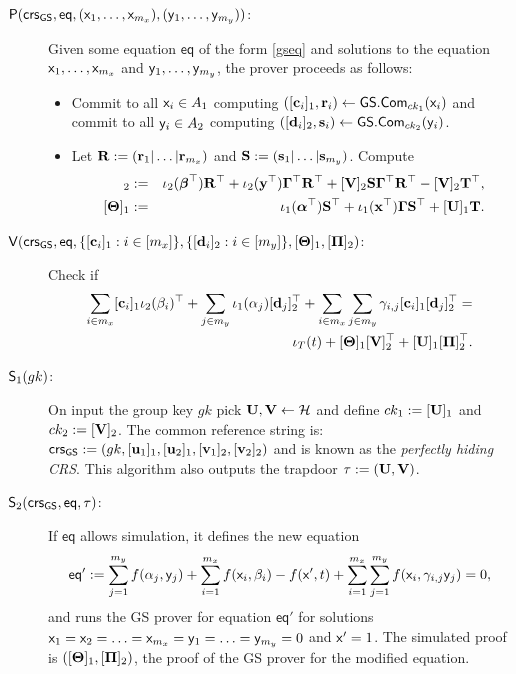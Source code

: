 \begin{description}
\item[$\mathsf{P}(\mathsf{crs}_{\mathsf{GS}},\mathsf{eq},(\mathsf{x}_1,\ldots,\mathsf{x}_{m_x}),(\mathsf{y}_1,\ldots,\mathsf{y}_{m_y}))$:] Given some equation $\mathsf{eq}$ of the form \ref{gseq} and solutions to the equation
$\mathsf{x}_1,\ldots,\mathsf{x}_{m_x}$ and $\mathsf{y}_1,\ldots,\mathsf{y}_{m_y}$, the prover proceeds as follows:
\begin{itemize}
\item Commit to all $\mathsf{x}_i \in A_1$ computing $([\mathbf{c}_i]_1,\mathbf{r}_i)\gets{\mathsf{GS}}.\mathsf{Com}_{ck_1}(\mathsf{x}_i)$ and commit to all $\mathsf{y}_i \in A_2$ computing $([\mathbf{d}_i]_2,\mathbf{s}_i)\gets{\mathsf{GS}}.\mathsf{Com}_{ck_2}(\mathsf{y}_i)$.
\item Let $\mathbf{{R}} := (\mathbf{r}_1|\ldots|\mathbf{r}_{m_x})$ and $\mathbf{{S}} := (\mathbf{s}_1|\ldots|\mathbf{s}_{m_y})$. Compute 
\begin{eqnarray*}
[\matr{\Pi}]_2 
& := & \iota_2(\boldsymbol \beta^{\top}) \matr{R}^\top +\iota_2(\vecb{y}^{\top}) \matr{\EscQE}^\top  \matr{R}^{\top}+
[\matr{V}]_2\matr{S} \matr{\EscQE}^\top \matr{R}^\top - [\matr{V}]_2 \matr{T}^\top,\\
\  [\matr{\Theta}]_1 &  := &\iota_1(\boldsymbol \alpha^{\top}) \matr{S}^\top +\iota_1(\vecb{x}^{\top}) \matr{\EscQE} \matr{S}^{\top}+ [\matr{U}]_1 \matr{T}.
 \end{eqnarray*}
\end{itemize}
\item[{$\mathsf{V}(\mathsf{crs}_{\mathsf{GS}},\mathsf{eq},\{[\mathbf{c}_i]_1:i\in[m_x]\},\{[\mathbf{d}_i]_2:i\in[m_y]\},[\mathbf{{\Theta}}]_1,[\mathbf{{\Pi}}]_2)$}:] Check if
\begin{eqnarray*}
\sum_{i \in m_x} [\mathbf{c}_i]_1 \iota_2(\beta_i)^{\top} + \sum_{j \in m_y} \iota_1(\alpha_j) [\mathbf{d}_j]_2^{\top} 
+ \sum_{i \in m_x}\sum_{j \in m_y}\gamma_{i,j} [\mathbf{c}_i]_1 [\mathbf{d}_j]_2^{\top} = \\ \iota_T(t) +[\mathbf{{\Theta}}]_1[\mathbf{{V}}]_2^\top + [\mathbf{{U}}]_1[\mathbf{{\Pi}}]_2^\top.
\end{eqnarray*}
\item[$\mathsf{S}_1(gk)$:]  On input the group key $gk$ pick $\mathbf{{U}},\mathbf{{V}}\gets\mathcal{H}$ and define $ck_1 := [\mathbf{{U}}]_1$ and $ck_2:=[\mathbf{{V}}]_2$.
   The common reference string is:
   $\mathsf{crs}_{\mathsf{GS}}:=(gk,[\mathbf{u}_1]_1,[\mathbf{u}_2]_1,[\mathbf{v}_1]_2,[\mathbf{v}_2]_2)$ and is known as the \emph{perfectly hiding CRS}. This algorithm also outputs the trapdoor $\tau:=(\mathbf{{U}},\mathbf{{V}})$.
\item[$\mathsf{S}_2(\mathsf{crs}_{\mathsf{GS}},\mathsf{eq},\tau)$:] If $\mathsf{eq}$ allows simulation, it defines the new equation
\begin{equation}
\mathsf{eq}':=\sum_{j=1}^{m_y} f(\alpha_j, \mathsf{y}_j)+\sum_{i=1}^{m_x} f(\mathsf{x}_i, \beta_i)-f(\mathsf{x}',t)+\sum_{i=1}^{m_x} \sum_{j=1}^{m_y}  f(\mathsf{x}_i,\gamma_{i,j} \mathsf{y}_j)=0,
\end{equation}
and runs the GS prover for equation $\mathsf{eq}'$ for solutions $\mathsf{x}_1=\mathsf{x}_2=\ldots=\mathsf{x}_{m_x}=\mathsf{y}_1=\ldots=\mathsf{y}_{m_y}=0$ and $\mathsf{x}'=1$. The simulated proof is $([\mathbf{{\Theta}}]_1,[\mathbf{{\Pi}}]_2)$, the proof of the GS prover for the modified equation.

\end{description}
